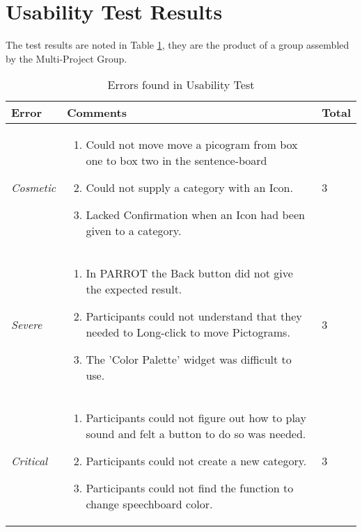 \section{Usability Test Results}
\label{sec:UseTestRes}
The test results are noted in Table \ref{tab:ErrorsFoundInUsabilityTest}, they are the product of a group assembled by the Multi-Project Group.

\begin{table}
	\centering
		\begin{tabular}{| l | p{5cm} | l |}
		\hline
			\textbf{Error} & \textbf{Comments} & Total\\
		\hline
			\textit{Cosmetic} & \begin{enumerate}
														\item Could not move move a picogram from box one to box two in the sentence-board
														\item Could not supply a category with an Icon.
														\item Lacked Confirmation when an Icon had been given to a category.
													\end{enumerate} & 3 \\ 
		\hline
			\textit{Severe} & \begin{enumerate}
													\item In PARROT the Back button did not give the expected result.
													\item Participants could not understand that they needed to Long-click to move Pictograms.
													\item The 'Color Palette' widget was difficult to use.
												\end{enumerate} & 3 \\
		\hline
			\textit{Critical} & \begin{enumerate}
														\item Participants could not figure out how to play sound and felt a button to do so was needed.
														\item Participants could not create a new category.
														\item Participants could not find the function to change speechboard color.
													\end{enumerate} & 3 \\
		\hline
		\end{tabular}
	\caption{Errors found in Usability Test}
	\label{tab:ErrorsFoundInUsabilityTest}
\end{table}